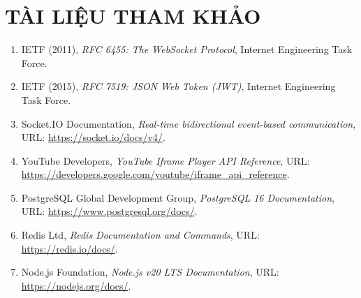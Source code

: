 \documentclass[12pt,a4paper]{extarticle}
\begin{document}
\newpage

\section*{TÀI LIỆU THAM KHẢO}

\begin{enumerate}[leftmargin=1.2cm]
    \item IETF (2011), \textit{RFC 6455: The WebSocket Protocol}, Internet Engineering Task Force.
    \item IETF (2015), \textit{RFC 7519: JSON Web Token (JWT)}, Internet Engineering Task Force.
    \item Socket.IO Documentation, \textit{Real-time bidirectional event-based communication}, URL: \url{https://socket.io/docs/v4/}.
    \item YouTube Developers, \textit{YouTube Iframe Player API Reference}, URL: \url{https://developers.google.com/youtube/iframe_api_reference}.
    \item PostgreSQL Global Development Group, \textit{PostgreSQL 16 Documentation}, URL: \url{https://www.postgresql.org/docs/}.
    \item Redis Ltd, \textit{Redis Documentation and Commands}, URL: \url{https://redis.io/docs/}.
    \item Node.js Foundation, \textit{Node.js v20 LTS Documentation}, URL: \url{https://nodejs.org/docs/}.
\end{enumerate}
\end{document}
